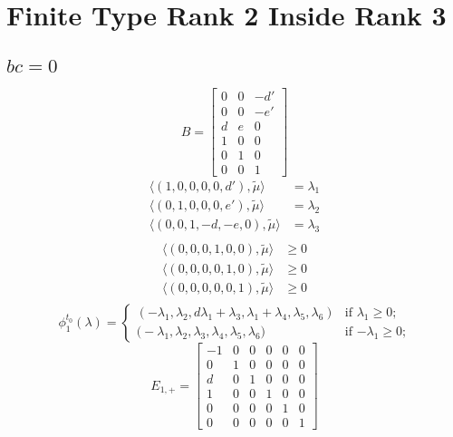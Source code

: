 \documentclass{amsart}
\numberwithin{theorem}{section}
\begin{document}
  \section{Finite Type Rank 2 Inside Rank 3}

  \subsection{$bc=0$}
  \[
    B=\left[\begin{array}{ccc} 
    0 & 0 & -d' \\ 
    0 & 0 & -e'\\ 
    d & e & 0\\ 
    1 & 0 & 0\\ 
    0 & 1 & 0\\ 
    0 & 0 & 1
    \end{array}\right]
  \]
  \begin{align*}
    \langle (1,0,0,0,0,d'), \tilde\mu\rangle &= \lambda_1\\ 
    \langle (0,1,0,0,0,e'), \tilde\mu\rangle &= \lambda_2\\ 
    \langle (0,0,1,-d,-e,0), \tilde\mu\rangle &= \lambda_3\\ 
  \end{align*}
  \begin{align*}
    \langle (0,0,0,1,0,0), \tilde\mu\rangle &\ge 0\\ 
    \langle (0,0,0,0,1,0), \tilde\mu\rangle &\ge 0\\ 
    \langle (0,0,0,0,0,1), \tilde\mu\rangle &\ge 0\\ 
  \end{align*}
  \[
    \phi^{t_0}_1(\lambda)
    =
    \begin{cases} 
      (-\lambda_1,\lambda_2,d\lambda_1+\lambda_3,\lambda_1+\lambda_4,\lambda_5,\lambda_6) & \text{if $\lambda_1 \ge 0$;}\\
      \big(-\lambda_1,\lambda_2,\lambda_3,\lambda_4,\lambda_5,\lambda_6\big) & \text{if $-\lambda_1 \ge 0$;}
    \end{cases}
  \]
  \[E_{1,+}=\left[\begin{array}{cccccc} -1 & 0 & 0 & 0 & 0 & 0 \\ 0 & 1 & 0 & 0 & 0 & 0\\ d & 0 & 1 & 0 & 0 & 0\\ 1 & 0 & 0 & 1 & 0 & 0\\ 0 & 0 & 0 & 0 & 1 & 0\\ 0 & 0 & 0 & 0 & 0 &  1\end{array}\right]\]
\end{document}
